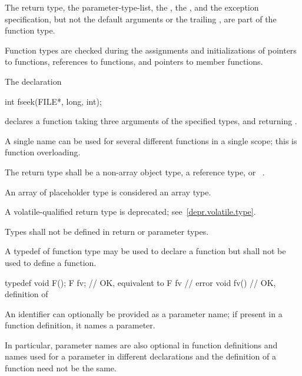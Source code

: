 \pnum
The return type, the parameter-type-list, the ,
the , and
the exception specification,
but not the default arguments
or the trailing ,
are part of the function type.
\begin{note}
Function types are checked during the assignments and initializations of
pointers to functions, references to functions, and pointers to member functions.
\end{note}

\pnum
\begin{example}
The declaration
\begin{codeblock}
int fseek(FILE*, long, int);
\end{codeblock}
declares a function taking three arguments of the specified types,
and returning
.
\end{example}

\pnum
{}%
\begin{note}
A single name can be used for several different functions in a single scope;
this is function overloading.
\end{note}

\pnum
{}%
%
The return type shall be a non-array object type, a reference type, or \cv{}~.
\begin{note}
An array of placeholder type is considered an array type.
\end{note}

\pnum
A volatile-qualified return type is deprecated;
see~\ref{depr.volatile.type}.

\pnum
Types shall not be defined in return or parameter types.

\pnum
{}%
A typedef of function type may be used to declare a function but shall not be
used to define a function.
\begin{example}
\begin{codeblock}
typedef void F();
F  fv;              // OK, equivalent to 
F  fv { }           // error
void fv() { }       // OK, definition of 
\end{codeblock}
\end{example}

\pnum
An identifier can optionally be provided as a parameter name;
if present in a function definition, it names a parameter.
\begin{note}
In particular, parameter names are also optional in function definitions
and names used for a parameter in different declarations and the definition
of a function need not be the same.
\end{note}

